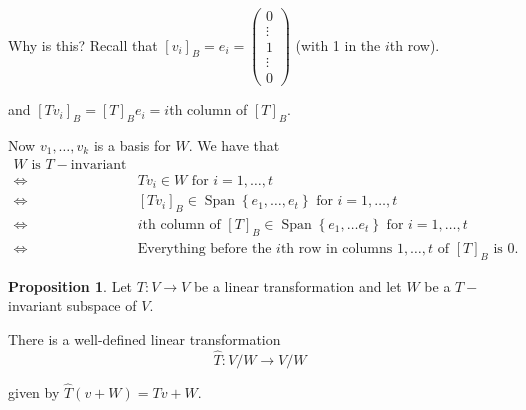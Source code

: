 \documentclass{article}
\theoremstyle{definition} \newtheorem*{definition}{Definition}
\newtheorem{proposition}[theorem]{Proposition}
\DeclareMathOperator{\Span}{Span}
\begin{document}
 Why is this? Recall that 
 $[v_i]_B = e_i = \left( 
 \begin{matrix}
   0 \\
   \vdots \\
   1 \\
   \vdots \\
   0
 \end{matrix}
 \right)$ (with 1 in the $i$th row).

 and $[Tv_i]_B = [T]_B e_i = i$th column of $[T]_B$.

 Now $v_1,\dots,v_k$ is a basis for $W$. We have that
 \begin{align*}
   W \text{ is }T-\text{invariant} \\
   \iff &Tv_i \in W \text{ for } i = 1, \dots, t \\
   \iff &[Tv_i]_B \in \Span\left\{ e_1, \dots, e_t \right\} 
   \text{ for } i = 1, \dots , t \\
   \iff &i\text{th column of } [T]_B \in 
   \Span \left\{ e_1, \dots e_t \right\} \text{ for } i = 1, \dots, t \\
   \iff &\text{Everything before the }i\text{th row in columns }1, 
   \dots, t \text{ of } [T]_B \text{ is }0.
 \end{align*}

 \begin{proposition}
   Let $T:V \rightarrow V$ be a linear transformation and let $W$ be a $T-$invariant
   subspace of $V$.

   There is a well-defined linear transformation 
   \[
     \hat{T} : V/W \rightarrow V/W
   \]

   given by $\hat{T}(v + W) = Tv + W$.
 \end{proposition}
\end{document}

